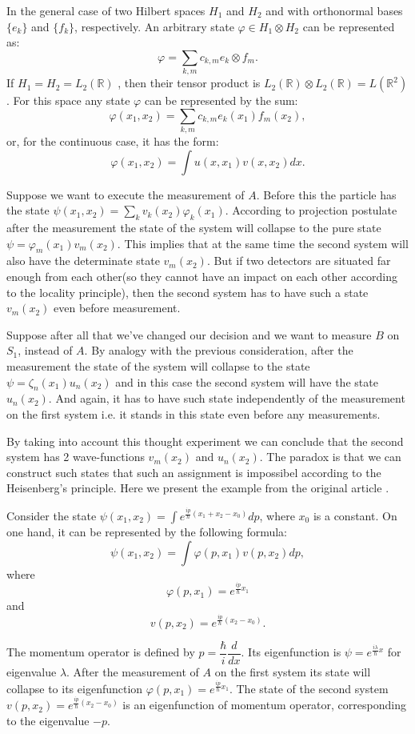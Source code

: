 \documentclass[%
master,         %
subf,           %
href,           %
colorlinks=true %
]{disser}
\numberwithin{equation}{section}
\numberwithin{figure}{section}
\begin{document}
In the general case of two Hilbert spaces $H_1$ and $H_2$ and with orthonormal bases $\{e_k\}$ and $\{f_k\}$, respectively. An arbitrary state $\varphi \in H_1 \otimes H_2$  can be represented as:
\[
\varphi = \sum_{k, m}c_{k, m}e_k\otimes f_m.
\]
If $H_1 = H_2 = L_2(\mathbb{R})$ , then their tensor product is $L_2(\mathbb{R})\otimes L_2(\mathbb{R}) = L(\mathbb{R}^2)$. For this space any state $\varphi$ can be represented by the sum:
\[
\varphi (x_1, x_2) = \sum_{k, m}c_{k, m}e_k(x_1)f_m(x_2),
\]
or, for the continuous case, it has the form:
\[
\varphi (x_1, x_2) = \int u(x, x_1)v(x, x_2)dx.
\]

Suppose we want to execute the measurement of $A$. Before this the particle has the state $\psi(x_1, x_2) = \sum_k v_k(x_2)\varphi_k(x_1)$. According to projection postulate after the measurement the state of the system will collapse to the pure state $\psi = \varphi_m(x_1)v_m(x_2)$.  This implies that at the same time the second system will also have the determinate state $v_m(x_2)$. But if two detectors are situated far enough from each other(so they cannot have an impact on each other according to the locality principle), then the second system has to have such a state $v_m(x_2)$ even before measurement.

Suppose after all that we've changed our decision and we want to measure $B$ on $S_1$, instead of $A$. By analogy with the previous consideration, after the measurement the state of the system will collapse to the state $\psi = \zeta_n(x_1)u_n(x_2)$ and in this case the second system will have the state $u_n(x_2)$. And again, it has to have such state independently of the measurement on the first system i.e. it stands in this state even before any measurements.

By taking into account this thought experiment we can conclude that the second system has 2 wave-functions $v_m(x_2)$ and $u_n(x_2)$. The paradox is that we can construct such states that such an assignment is impossibel according to the Heisenberg's principle. Here we present the example from the original article \cite{EPR}.

Consider the state $\psi(x_1, x_2) = \int e^{\frac{ip}{\hbar}(x_1+x_2-x_0)}dp$, where $x_0$ is a constant. On one hand, it can be represented by the following formula: 
\[
\psi(x_1, x_2) = \int\varphi(p, x_1)v(p, x_2)dp,
\]
 where 
\[
\varphi(p, x_1) = e^{\frac{ip}{\hbar}x_1}
\]
and 
\[
v(p, x_2) = e^{\frac{ip}{\hbar}(x_2-x_0)}.
\]

The momentum operator is defined by $\hat{p} = \dfrac{\hbar}{i}\dfrac{d}{dx}$. Its eigenfunction is $\psi = e^{\frac{i\lambda}{\hbar}x}$ for eigenvalue $\lambda$. After the measurement of $A$ on the first system its state will collapse to its eigenfunction $\varphi(p, x_1) = e^{\frac{ip}{\hbar}x_1}$. The state of the second system $v(p, x_2) = e^{\frac{ip}{\hbar}(x_2-x_0)}$ is an eigenfunction of momentum operator, corresponding to the eigenvalue $-p$. 
\end{document}
